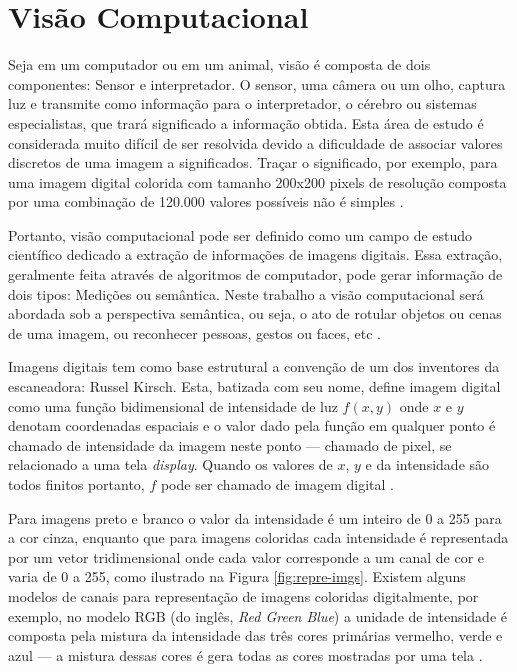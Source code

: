 \documentclass[12pt]{report}
\begin{document}
\section{Visão Computacional}

Seja em um computador ou em um animal, visão é composta de dois componentes: Sensor e interpretador. O sensor, uma câmera ou um olho, captura luz e transmite como informação para o interpretador, o cérebro ou sistemas especialistas, que trará significado a informação obtida. Esta área de estudo é considerada muito difícil de ser resolvida devido a dificuldade de associar valores discretos de uma imagem a significados. Traçar o significado, por exemplo, para uma imagem digital colorida com tamanho 200x200 pixels de resolução composta por uma combinação de 120.000 valores possíveis não é simples \cite{stanford}.

Portanto, visão computacional pode ser definido como um campo de estudo científico dedicado a extração de informações de imagens digitais. Essa extração, geralmente feita através de algoritmos de computador, pode gerar informação de dois tipos: Medições ou semântica. Neste trabalho a visão computacional será abordada sob a perspectiva semântica, ou seja, o ato de rotular objetos ou cenas de uma imagem, ou reconhecer pessoas, gestos ou faces, etc \cite{stanford}.

Imagens digitais tem como base estrutural a convenção de um dos inventores da escaneadora: Russel Kirsch. Esta, batizada com seu nome, define imagem digital como uma função bidimensional de intensidade de luz $f(x, y)$ onde $x$ e $y$ denotam coordenadas espaciais e o valor dado pela função em qualquer ponto é chamado de intensidade da imagem neste ponto --- chamado de pixel, se relacionado a uma tela \textit{display}. Quando os valores de $x$, $y$ e da intensidade são todos finitos portanto, $f$ pode ser chamado de imagem digital \cite{gonzalez}. 

Para imagens preto e branco o valor da intensidade é um inteiro de 0 a 255 para a cor cinza, enquanto que para imagens coloridas cada intensidade é representada por um vetor tridimensional onde cada valor corresponde a um canal de cor e varia de 0 a 255, como ilustrado na Figura \ref{fig:repre-imgs}. Existem alguns modelos de canais para representação de imagens coloridas digitalmente, por exemplo, no modelo RGB (do inglês, \textit{Red Green Blue}) a unidade de intensidade é composta pela mistura da intensidade das três cores primárias vermelho, verde e azul --- a mistura dessas cores é gera todas as cores mostradas por uma tela \cite{gonzalez}. 
\end{document}
